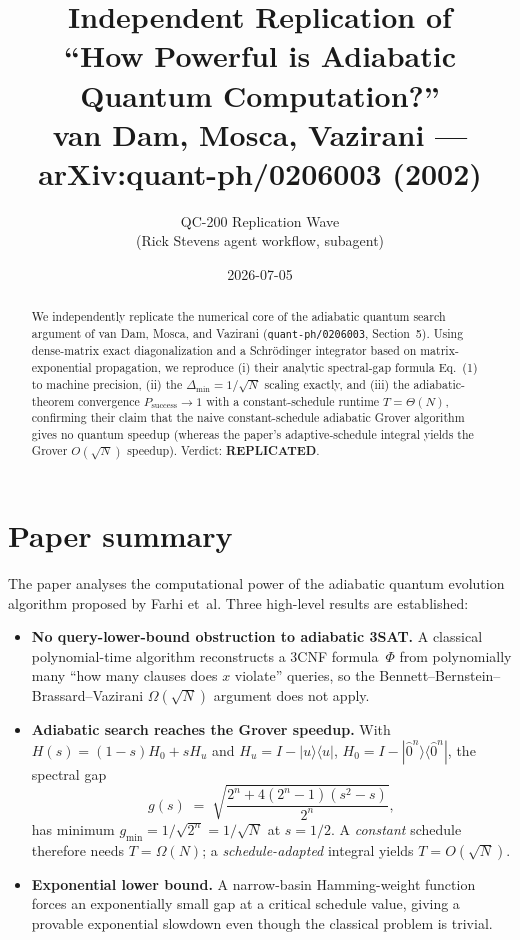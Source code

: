 \documentclass[11pt]{article}
\title{Independent Replication of\\
       ``How Powerful is Adiabatic Quantum Computation?''\\
       {\normalsize van Dam, Mosca, Vazirani --- arXiv:quant-ph/0206003 (2002)}}
\author{QC-200 Replication Wave\\ (Rick Stevens agent workflow, subagent)}
\date{2026-07-05}
\begin{document}
\maketitle

\begin{abstract}
We independently replicate the numerical core of the adiabatic quantum search
argument of van Dam, Mosca, and Vazirani (\texttt{quant-ph/0206003}, Section~5).
Using dense-matrix exact diagonalization and a Schr\"odinger integrator based on
matrix-exponential propagation, we reproduce (i) their analytic spectral-gap
formula Eq.~(1) to machine precision, (ii) the $\Delta_{\min} = 1/\sqrt{N}$
scaling exactly, and (iii) the adiabatic-theorem convergence
$P_{\mathrm{success}} \to 1$ with a constant-schedule runtime $T = \Theta(N)$,
confirming their claim that the naive constant-schedule adiabatic Grover
algorithm gives no quantum speedup (whereas the paper's adaptive-schedule
integral yields the Grover $O(\sqrt{N})$ speedup). Verdict: {\bf REPLICATED}.
\end{abstract}

\section{Paper summary}
The paper analyses the computational power of the adiabatic quantum evolution
algorithm proposed by Farhi et~al. Three high-level results are established:
\begin{itemize}
\item {\bf No query-lower-bound obstruction to adiabatic 3SAT.} A classical
polynomial-time algorithm reconstructs a 3CNF formula~$\Phi$ from polynomially
many ``how many clauses does $x$ violate'' queries, so the
Bennett--Bernstein--Brassard--Vazirani $\Omega(\sqrt{N})$ argument does not
apply.
\item {\bf Adiabatic search reaches the Grover speedup.} With
$H(s) = (1-s) H_0 + s H_u$ and $H_u = I - |u\rangle\langle u|$,
$H_0 = I - |\hat 0^n\rangle\langle \hat 0^n|$, the spectral gap
\begin{equation}
g(s) \;=\; \sqrt{\frac{2^n + 4(2^n-1)(s^2-s)}{2^n}}, \tag{Eq.~1}
\end{equation}
has minimum $g_{\min} = 1/\sqrt{2^n} = 1/\sqrt{N}$ at $s=1/2$. A
\emph{constant} schedule therefore needs $T = \Omega(N)$; a
\emph{schedule-adapted} integral yields $T = O(\sqrt{N})$.
\item {\bf Exponential lower bound.} A narrow-basin Hamming-weight function
forces an exponentially small gap at a critical schedule value, giving a
provable exponential slowdown even though the classical problem is trivial.
\end{itemize}
\end{document}
